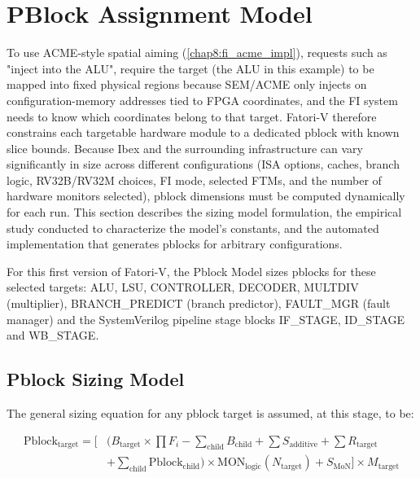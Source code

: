 \section{PBlock Assignment Model}
\label{chap7:pblock}

To use \ac{ACME}-style spatial aiming (\cref{chap8:fi_acme_impl}), requests such as "inject into the \ac{ALU}", require the target (the \ac{ALU} in this example) to be mapped into fixed physical regions because \ac{SEM}/\ac{ACME} only injects on configuration-memory addresses tied to \ac{FPGA} coordinates, and the \ac{FI} system needs to know which coordinates belong to that target. \ac{Fatori-V} therefore constrains each targetable hardware module to a dedicated pblock with known slice bounds. Because Ibex and the surrounding infrastructure can vary significantly in size across different configurations (\ac{ISA} options, caches, branch logic, RV32B/RV32M choices, \ac{FI} mode, selected \acp{FTM}, and the number of hardware monitors selected), pblock dimensions must be computed dynamically for each run. This section describes the sizing model formulation, the empirical study conducted to characterize the model's constants, and the automated implementation that generates pblocks for arbitrary configurations.

For this first version of \ac{Fatori-V}, the Pblock Model sizes pblocks for these selected targets: ALU, LSU, CONTROLLER, DECODER, MULTDIV (multiplier), BRANCH\_PREDICT (branch predictor), FAULT\_MGR (fault manager) and the SystemVerilog pipeline stage blocks IF\_STAGE, ID\_STAGE and WB\_STAGE.

\subsection{Pblock Sizing Model}
\label{chap7:pblock_sizing_model}

The general sizing equation for any pblock target is assumed, at this stage, to be:

\begin{equation}
\begin{aligned}
\text{Pblock}_{\text{target}} = \Bigg[ & \Big( B_{\text{target}} \times \prod F_i  - \sum_{\text{child}} B_{\text{child}} + \sum S_{\text{additive}} + \sum R_{\text{target}} \\
&  + \sum_{\text{child}} \text{Pblock}_{\text{child}} \Big) \times \text{MON}_{\text{logic}}(N_{\text{target}}) + S_{\text{MoN}}\Bigg] \times M_{\text{target}}
\end{aligned}
\label{eq:pblock_general}
\end{equation}

